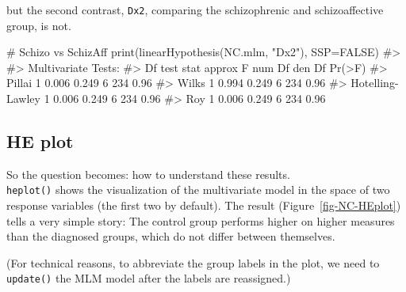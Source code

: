\documentclass[
  letterpaper,
  10pt,
  krantz2]{krantz}
\makeatletter
\newenvironment{Shaded}{\begin{snugshade}}{\end{snugshade}}
\newcommand{\AttributeTok}[1]{\textcolor[rgb]{0.40,0.45,0.13}{#1}}
\newcommand{\CommentTok}[1]{\textcolor[rgb]{0.37,0.37,0.37}{#1}}
\newcommand{\ConstantTok}[1]{\textcolor[rgb]{0.56,0.35,0.01}{#1}}
\newcommand{\FunctionTok}[1]{\textcolor[rgb]{0.28,0.35,0.67}{#1}}
\newcommand{\NormalTok}[1]{\textcolor[rgb]{0.00,0.23,0.31}{#1}}
\newcommand{\OtherTok}[1]{\textcolor[rgb]{0.00,0.23,0.31}{#1}}
\newcommand{\SpecialCharTok}[1]{\textcolor[rgb]{0.37,0.37,0.37}{#1}}
\newcommand{\StringTok}[1]{\textcolor[rgb]{0.13,0.47,0.30}{#1}}
\newenvironment{kframe}{%
  \medskip{}
  \setlength{\fboxsep}{.8em}
  \def\at@end@of@kframe{}%
  \ifinner\ifhmode%
  \def\at@end@of@kframe{\end{minipage}}%
  \begin{minipage}{\columnwidth}%
  \fi\fi%
  \def\FrameCommand##1{\hskip\@totalleftmargin \hskip-\fboxsep
  \colorbox{shadecolor}{##1}\hskip-\fboxsep
      \hskip-\linewidth \hskip-\@totalleftmargin \hskip\columnwidth}%
  \MakeFramed {\advance\hsize-\width
    \@totalleftmargin\z@ \linewidth\hsize
    \@setminipage}}%
{\par\unskip\endMakeFramed%
  \at@end@of@kframe}
\renewenvironment{Shaded}{\begin{kframe}}{\end{kframe}}
\makeatother
\begin{document}
but the second contrast, \texttt{Dx2}, comparing the schizophrenic and
schizoaffective group, is not.

\begin{Shaded}
\begin{Highlighting}[]
\CommentTok{\# Schizo vs SchizAff}
\FunctionTok{print}\NormalTok{(}\FunctionTok{linearHypothesis}\NormalTok{(NC.mlm, }\StringTok{"Dx2"}\NormalTok{), }\AttributeTok{SSP=}\ConstantTok{FALSE}\NormalTok{)}
\CommentTok{\#\textgreater{} }
\CommentTok{\#\textgreater{} Multivariate Tests: }
\CommentTok{\#\textgreater{}                  Df test stat approx F num Df den Df Pr(\textgreater{}F)}
\CommentTok{\#\textgreater{} Pillai            1     0.006    0.249      6    234   0.96}
\CommentTok{\#\textgreater{} Wilks             1     0.994    0.249      6    234   0.96}
\CommentTok{\#\textgreater{} Hotelling{-}Lawley  1     0.006    0.249      6    234   0.96}
\CommentTok{\#\textgreater{} Roy               1     0.006    0.249      6    234   0.96}
\end{Highlighting}
\end{Shaded}

\hypertarget{he-plot}{%
\subsection{HE plot}\label{he-plot}}

So the question becomes: how to understand these results.\\
\texttt{heplot()} shows the visualization of the multivariate model in
the space of two response variables (the first two by default). The
result (Figure~\ref{fig-NC-HEplot}) tells a very simple story: The
control group performs higher on higher measures than the diagnosed
groups, which do not differ between themselves.

(For technical reasons, to abbreviate the group labels in the plot, we
need to \texttt{update()} the MLM model after the labels are
reassigned.)

\begin{Shaded}
\end{Shaded}
\end{document}
